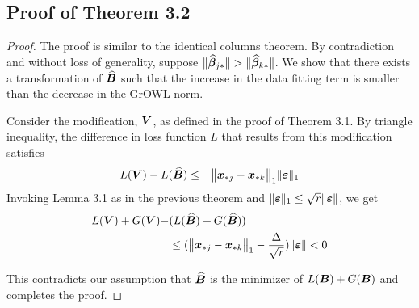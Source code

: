 \subsection*{Proof of Theorem 3.2}
\begin{proof}
The proof is similar to the identical columns theorem. By contradiction and without loss
of generality, suppose $\|\widehat {\boldsymbol{\beta}}_{j {\ast}}\| > \|\widehat {\boldsymbol{\beta}}_{k {\ast}}\|$. We show
that there exists a transformation of $\widehat{\boldsymbol{B}}$ such that the increase in the data
fitting term is smaller than the decrease in the GrOWL norm.

Consider the modification, $\boldsymbol{V}$, as defined in the proof of Theorem 3.1. By
triangle inequality, the difference in loss function $L$ that results from this
modification satisfies
\begin{eqnarray*}
L(\bm V) - L(\widehat{\bm B})  & \leq  & \bigl\|{\bm x}_{{\ast} j}- {\bm x}_{{\ast} k}\bigr\|_1  \|\boldsymbol{\varepsilon} \|_1  
\end{eqnarray*}
Invoking Lemma 3.1 as in the previous theorem and $\| \boldsymbol{\varepsilon} \|_1 \leq \sqrt{r} \| \boldsymbol{\varepsilon} \|$,
we get
\begin{align*}
L(\boldsymbol{V}) + G(\boldsymbol{V}) - &( L(\widehat{\boldsymbol{B}}) + G(\widehat{\boldsymbol{B}}) ) \\
&\leq (\bigl\|{\bm x}_{{\ast} j}- {\bm x}_{{\ast} k}\bigr\|_1 -  \frac{\Delta}{\sqrt{r}}) \|\boldsymbol{\varepsilon}\| <  0
\end{align*}

This contradicts our assumption that $\widehat{\boldsymbol{B}}$ is the minimizer of $L(\boldsymbol{B}) + G(\boldsymbol{B})$
and completes the proof.
\end{proof}

